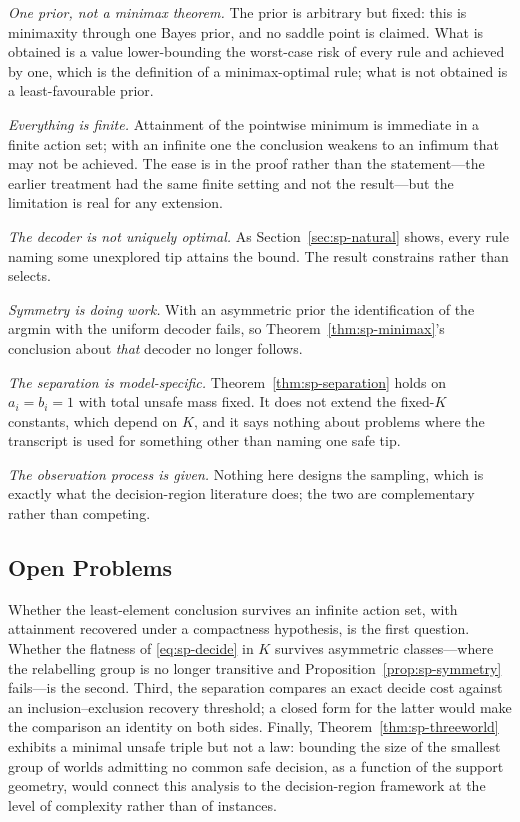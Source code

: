 \emph{One prior, not a minimax theorem.} The prior is arbitrary but fixed: this is minimaxity
through one Bayes prior, and no saddle point is claimed. What is obtained is a value
lower-bounding the worst-case risk of every rule and achieved by one, which is the definition
of a minimax-optimal rule; what is not obtained is a least-favourable prior.

\emph{Everything is finite.} Attainment of the pointwise minimum is immediate in a finite
action set; with an infinite one the conclusion weakens to an infimum that may not be achieved.
The ease is in the proof rather than the statement---the earlier treatment had the same finite
setting and not the result---but the limitation is real for any extension.

\emph{The decoder is not uniquely optimal.} As Section~\ref{sec:sp-natural} shows, every rule
naming some unexplored tip attains the bound. The result constrains rather than selects.

\emph{Symmetry is doing work.} With an asymmetric prior the identification of the argmin with
the uniform decoder fails, so Theorem~\ref{thm:sp-minimax}'s conclusion about \emph{that} decoder
no longer follows.

\emph{The separation is model-specific.} Theorem~\ref{thm:sp-separation} holds on
$a_{i}=b_{i}=1$ with total unsafe mass fixed. It does not extend the fixed-$K$ constants,
which depend on $K$, and it says nothing about problems where the transcript is used for
something other than naming one safe tip.

\emph{The observation process is given.} Nothing here designs the sampling, which is exactly
what the decision-region literature does; the two are complementary rather than competing.

\subsection{Open Problems}

Whether the least-element conclusion survives an infinite action set, with attainment recovered
under a compactness hypothesis, is the first question. Whether the flatness of
\eqref{eq:sp-decide} in $K$ survives asymmetric classes---where the relabelling group is no longer
transitive and Proposition~\ref{prop:sp-symmetry} fails---is the second. Third, the separation
compares an exact decide cost against an inclusion--exclusion recovery threshold; a closed form
for the latter would make the comparison an identity on both sides. Finally, Theorem~\ref{thm:sp-threeworld} exhibits a
minimal unsafe triple but not a law: bounding the size of the smallest group of worlds
admitting no common safe decision, as a function of the support geometry, would connect this
analysis to the decision-region framework at the level of complexity rather than of
instances.


